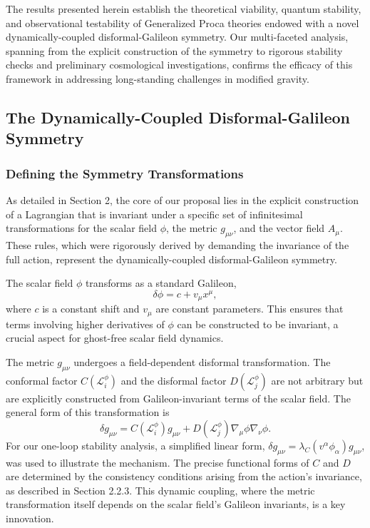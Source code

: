 \documentclass[twocolumn]{aastex631}
\begin{document}
The results presented herein establish the theoretical viability, quantum stability, and observational testability of Generalized Proca theories endowed with a novel dynamically-coupled disformal-Galileon symmetry. Our multi-faceted analysis, spanning from the explicit construction of the symmetry to rigorous stability checks and preliminary cosmological investigations, confirms the efficacy of this framework in addressing long-standing challenges in modified gravity.

\subsection{The Dynamically-Coupled Disformal-Galileon Symmetry}

\subsubsection{Defining the Symmetry Transformations}
As detailed in Section 2, the core of our proposal lies in the explicit construction of a Lagrangian that is invariant under a specific set of infinitesimal transformations for the scalar field $\phi$, the metric $g_{\mu\nu}$, and the vector field $A_\mu$. These rules, which were rigorously derived by demanding the invariance of the full action, represent the dynamically-coupled disformal-Galileon symmetry.

The scalar field $\phi$ transforms as a standard Galileon,
\begin{equation}
\delta \phi = c + v_\mu x^\mu,
\end{equation}
where $c$ is a constant shift and $v_\mu$ are constant parameters. This ensures that terms involving higher derivatives of $\phi$ can be constructed to be invariant, a crucial aspect for ghost-free scalar field dynamics.

The metric $g_{\mu\nu}$ undergoes a field-dependent disformal transformation. The conformal factor $C(\mathcal{L}_i^\phi)$ and the disformal factor $D(\mathcal{L}_j^\phi)$ are not arbitrary but are explicitly constructed from Galileon-invariant terms of the scalar field. The general form of this transformation is
\begin{equation}
\delta g_{\mu\nu} = C(\mathcal{L}_i^\phi) g_{\mu\nu} + D(\mathcal{L}_j^\phi) \nabla_\mu \phi \nabla_\nu \phi.
\end{equation}
For our one-loop stability analysis, a simplified linear form, $\delta g_{\mu\nu} = \lambda_C (v^\alpha \phi_\alpha) g_{\mu\nu}$, was used to illustrate the mechanism. The precise functional forms of $C$ and $D$ are determined by the consistency conditions arising from the action's invariance, as described in Section 2.2.3. This dynamic coupling, where the metric transformation itself depends on the scalar field's Galileon invariants, is a key innovation.
\end{document}
